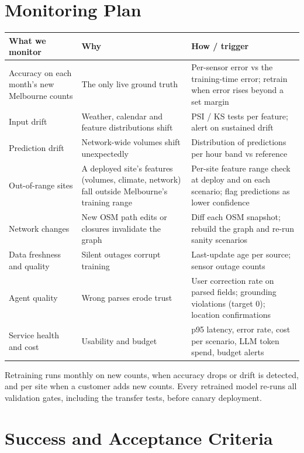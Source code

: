 \documentclass[11pt]{article}
\newcommand{\hrow}{\rowcolor{headgray}}
\begin{document}
\section{Monitoring Plan}

\begin{xltabular}{\linewidth}{|L{3.6cm}|Y|Y|}
\hline\hrow
\textbf{What we monitor} & \textbf{Why} & \textbf{How / trigger} \\\hline
\endhead
Accuracy on each month's new Melbourne counts & The only live ground truth & Per-sensor error vs the training-time error; retrain when error rises beyond a set margin \\\hline
Input drift & Weather, calendar and feature distributions shift & PSI / KS tests per feature; alert on sustained drift \\\hline
Prediction drift & Network-wide volumes shift unexpectedly & Distribution of predictions per hour band vs reference \\\hline
Out-of-range sites & A deployed site's features (volumes, climate, network) fall outside Melbourne's training range & Per-site feature range check at deploy and on each scenario; flag predictions as lower confidence \\\hline
Network changes & New OSM path edits or closures invalidate the graph & Diff each OSM snapshot; rebuild the graph and re-run sanity scenarios \\\hline
Data freshness and quality & Silent outages corrupt training & Last-update age per source; sensor outage counts \\\hline
Agent quality & Wrong parses erode trust & User correction rate on parsed fields; grounding violations (target 0); location confirmations \\\hline
Service health and cost & Usability and budget & p95 latency, error rate, cost per scenario, LLM token spend, budget alerts \\\hline
\end{xltabular}

Retraining runs monthly on new counts, when accuracy drops or drift is detected, and per site when a customer adds new counts. Every retrained model re-runs all validation gates, including the transfer tests, before canary deployment.

\section{Success and Acceptance Criteria}
\end{document}
